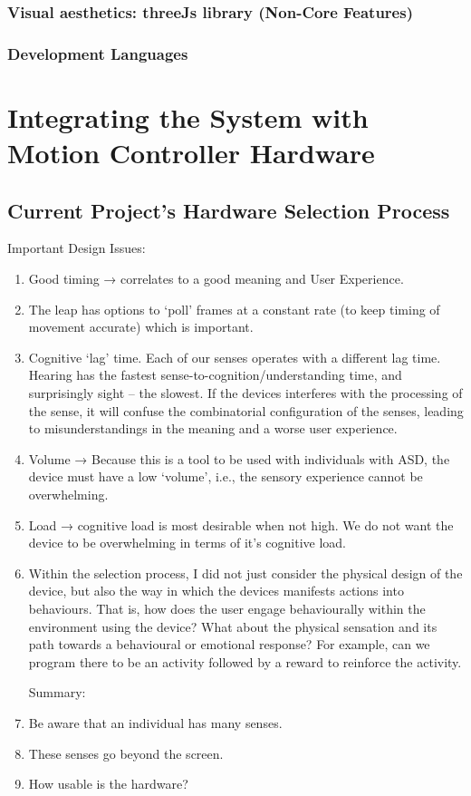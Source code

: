 \documentclass[10pt]{article}
\begin{document}
\subsubsection{Visual aesthetics: threeJs library (Non-Core Features)}
\subsubsection{Development Languages}

\section{Integrating the System with Motion Controller Hardware }\label{hardware}
\subsection{Current Project’s Hardware Selection Process}
Important Design Issues:
\begin{enumerate}
\item Good timing → correlates to a good meaning and User Experience.
\item The leap has options to ‘poll’ frames at a constant rate (to keep timing of movement accurate) which is important.
\item Cognitive ‘lag’ time. Each of our senses operates with a different lag time. Hearing has the fastest sense-to-cognition/understanding time, and surprisingly sight -- the slowest. If the devices interferes with the processing of the sense, it will confuse the combinatorial configuration of the senses, leading to misunderstandings in the meaning and a worse user experience.
\item Volume → Because this is a tool to be used with individuals with ASD, the device must have a low ‘volume’, i.e., the sensory experience cannot be overwhelming.
\item Load → cognitive load is most desirable when not high. We do not want the device to be overwhelming in terms of it’s cognitive load.
\item Within the selection process, I did not just consider the physical design of the device, but also the way in which the devices manifests actions into behaviours. That is, how does the user engage behaviourally within the environment using the device? What about the physical sensation and its path towards a behavioural or emotional response? For example, can we program there to be an activity followed by a reward to reinforce the activity.

Summary:
\item Be aware that an individual has many senses.
\item These senses go beyond the screen.
\item How usable is the hardware?

\end{enumerate}
\end{document}
